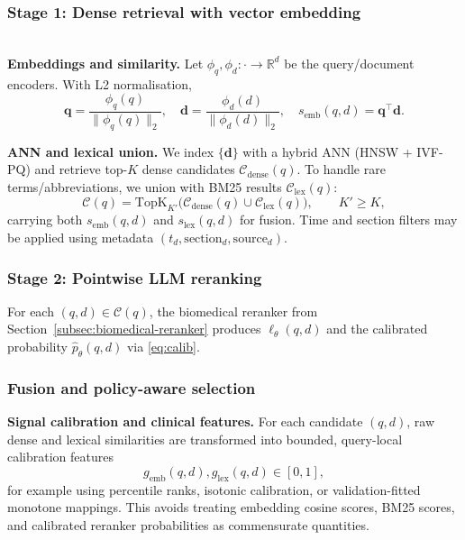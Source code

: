 \documentclass[conference]{IEEEtran}
\begin{document}
\subsubsection*{Stage 1: Dense retrieval with vector embedding}~\\
\textbf{Embeddings and similarity.} 
Let $\phi_q,\phi_d:\cdot\rightarrow\mathbb{R}^d$ be the query/document encoders. With L2 normalisation,
\begin{equation}
    \mathbf{q}=\frac{\phi_q(q)}{\|\phi_q(q)\|_2},\quad
    \mathbf{d}=\frac{\phi_d(d)}{\|\phi_d(d)\|_2},\quad
    s_{\mathrm{emb}}(q,d)=\mathbf{q}^{\top}\mathbf{d}.
\end{equation}

\textbf{ANN and lexical union.}
We index $\{\mathbf{d}\}$ with a hybrid ANN (HNSW + IVF-PQ) and retrieve top-$K$ dense candidates $\mathcal{C}_{\mathrm{dense}}(q)$. To handle rare terms/abbreviations, we union with BM25 results $\mathcal{C}_{\mathrm{lex}}(q)$:
\begin{equation}
\label{eq:cand-union}
    \mathcal{C}(q)=\mathrm{TopK}_{K'}\!\big(\mathcal{C}_{\mathrm{dense}}(q)\cup\mathcal{C}_{\mathrm{lex}}(q)\big),\qquad K'\ge K,
\end{equation}
carrying both $s_{\mathrm{emb}}(q,d)$ and $s_{\mathrm{lex}}(q,d)$ for fusion. Time and section filters may be applied using metadata $(t_d,\mathrm{section}_d,\mathrm{source}_d)$.


\subsubsection*{Stage 2: Pointwise LLM reranking}
For each $(q,d)\in\mathcal{C}(q)$, the biomedical reranker from Section~\ref{subsec:biomedical-reranker} produces $\ell_\theta(q,d)$ and the calibrated probability $\widehat{p}_\theta(q,d)$ via \eqref{eq:calib}.


\subsubsection*{Fusion and policy-aware selection}
\textbf{Signal calibration and clinical features.}
For each candidate $(q,d)$, raw dense and lexical similarities are transformed into bounded, query-local calibration features
\[
g_{\mathrm{emb}}(q,d),g_{\mathrm{lex}}(q,d)\in[0,1],
\]
for example using percentile ranks, isotonic calibration, or validation-fitted monotone mappings. This avoids treating embedding cosine scores, BM25 scores, and calibrated reranker probabilities as commensurate quantities.
\end{document}
